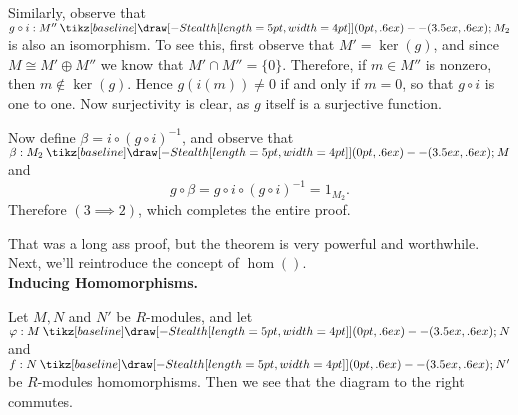 \documentclass[12pt,letterpaper]{algebra_book}
\renewcommand{\to}{\mathbin{\tikz[baseline] \draw[-{Stealth[length=5pt,width=4pt]}] (0pt,.6ex) -- (3.5ex,.6ex);}}
\renewcommand{\phi}{\varphi}
\theoremstyle{definition}
\begin{document}
\begin{prf}
\begin{description}
        Similarly, observe that $g \circ i: M'' \to M_2$ is also
        an isomorphism. To see this, first observe that $M' =
        \ker(g)$, and since $M \cong M' \oplus M''$ we know that
        $M' \cap M'' = \{0\}$. Therefore, if $m \in M''$ is
        nonzero, then $m \not\in \ker(g)$. Hence $g(i(m)) \ne 0$
        if and only if $m = 0$, so that $g \circ i$ is one to one.
        Now surjectivity is clear, as $g$ itself is a surjective
        function. 

        Now define $\beta = i \circ (g \circ i)^{-1}$, and observe
        that $\beta : M_2 \to M$ and 
        \[
            g \circ \beta = g \circ i \circ (g \circ i)^{-1} = 1_{M_2}.
        \]
        Therefore $(3 \implies 2)$, which completes the entire proof.
    \end{description}
\end{prf}

That was a long ass proof, but the theorem is very powerful and
worthwhile. Next, we'll reintroduce the concept of $\hom()$.
\\

\noindent \textbf{Inducing Homomorphisms.}

\begin{minipage}{0.6\textwidth}
    Let $M, N$ and $N'$ be $R$-modules, and let $\phi: M \to N$ and $f: N
    \to N'$ be $R$-modules homomorphisms. Then we see that
    the diagram to the right commutes.

\end{minipage}
\hfill
\begin{minipage}{0.4\textwidth}
    \begin{center}
    \end{center}
\end{minipage}
\vspace{0.5cm}
\end{document}
